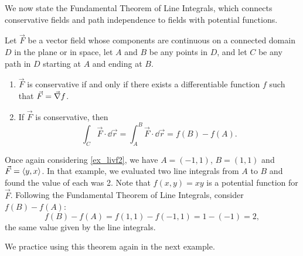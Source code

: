 We now state the Fundamental Theorem of Line Integrals, which connects conservative fields and path independence to fields with potential functions. 

\begin{theorem}\label{thm:FTofLineIntegrals}%
Let $\vec F$ be a vector field whose components are continuous on a connected domain $D$ in the plane or in space, let $A$ and $B$ be any points in $D$, and let $C$ be any path in $D$ starting at $A$ and ending at $B$.
\begin{enumerate}
	\item $\vec F$ is conservative if and only if there exists a differentiable function $f$ such that $\vec F = \vec\nabla f$. 
	\item	If $\vec F$ is conservative, then 
	\[\int_C\vec F\cdot\dd\vec r = \int_A^B \vec F\cdot\dd\vec r = f(B) - f(A).\]
\end{enumerate}
\end{theorem}

Once again considering \autoref{ex_livf2}, we have $A = (-1,1)$, $B = (1,1)$ and $\vec F =\left\langle y,x\right\rangle$. In that example, we evaluated two line integrals from $A$ to $B$ and found the value of each was 2. Note that $f(x,y) = xy$ is a potential function for $\vec F$. Following the Fundamental Theorem of Line Integrals, consider $f(B) - f(A)$:
\[f(B) - f(A) = f(1,1) - f(-1,1) = 1 - (-1) = 2,\]
the same value given by the line integrals.


We practice using this theorem again in the next example.

